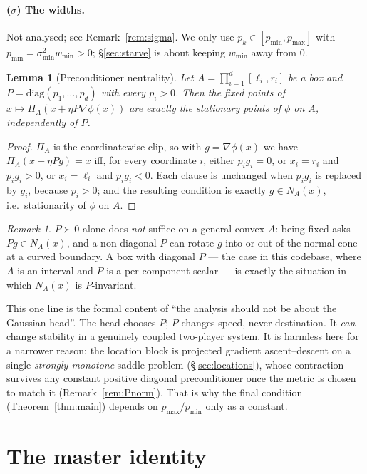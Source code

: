 \documentclass[11pt,a4paper]{article}
\theoremstyle{plain}
\newtheorem{lemma}[theorem]{Lemma}
\theoremstyle{definition}
\theoremstyle{remark}
\newtheorem{remark}[theorem]{Remark}
\begin{document}
\paragraph{(\texorpdfstring{$\sigma$}{sigma}) The widths.} Not analysed; see
Remark~\ref{rem:sigma}. We only use $p_k\in[p_{\min},p_{\max}]$ with
$p_{\min}=\sigma_{\min}^2 w_{\min}>0$; \S\ref{sec:starve} is about keeping
$w_{\min}$ away from $0$.

\begin{lemma}[Preconditioner neutrality]\label{lem:precond}
Let $A=\prod_{i=1}^d[\ell_i,r_i]$ be a box and $P=\mathrm{diag}(p_1,\dots,p_d)$ with
every $p_i>0$. Then the fixed points of $x\mapsto \Pi_A(x+\eta P\nabla\phi(x))$ are
exactly the stationary points of $\phi$ on $A$, independently of $P$.
\end{lemma}
\begin{proof}
$\Pi_A$ is the coordinatewise clip, so with $g=\nabla\phi(x)$ we have
$\Pi_A(x+\eta Pg)=x$ iff, for every coordinate $i$, either $p_ig_i=0$, or
$x_i=r_i$ and $p_ig_i>0$, or $x_i=\ell_i$ and $p_ig_i<0$. Each clause is unchanged
when $p_ig_i$ is replaced by $g_i$, because $p_i>0$; and the resulting condition is
exactly $g\in N_A(x)$, i.e.\ stationarity of $\phi$ on $A$.
\end{proof}

\begin{remark}
$P\succ0$ alone does \emph{not} suffice on a general convex $A$: being fixed asks
$Pg\in N_A(x)$, and a non-diagonal $P$ can rotate $g$ into or out of the normal cone
at a curved boundary. A box with diagonal $P$ --- the case in this codebase, where
$A$ is an interval and $P$ is a per-component scalar --- is exactly the situation in
which $N_A(x)$ is $P$-invariant.
\end{remark}

\noindent This one line is the formal content of ``the analysis should not be
about the Gaussian head''. The head chooses $P$; $P$ changes speed, never
destination. It \emph{can} change stability in a genuinely coupled two-player
system. It is harmless here for a narrower reason: the location block is projected
gradient ascent--descent on a single \emph{strongly monotone} saddle problem
(\S\ref{sec:locations}), whose contraction survives any constant positive diagonal
preconditioner once the metric is chosen to match it (Remark~\ref{rem:Pnorm}). That is
why the final condition (Theorem~\ref{thm:main}) depends on $p_{\max}/p_{\min}$ only as
a constant.

\section{The master identity}\label{sec:identity}
\end{document}
